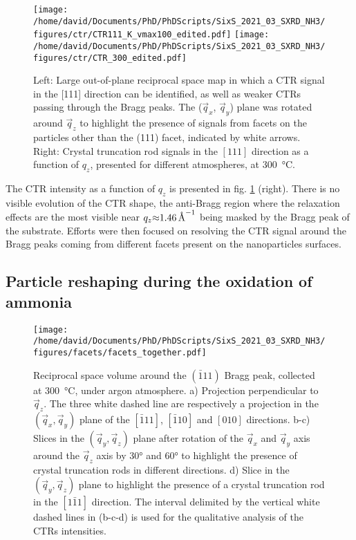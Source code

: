 \begin{figure}[!htb]
    \centering
    \texttt{[image: /home/david/Documents/PhD/PhDScripts/SixS\_2021\_03\_SXRD\_NH3/figures/ctr/CTR111\_K\_vmax100\_edited.pdf]}
    \texttt{[image: /home/david/Documents/PhD/PhDScripts/SixS\_2021\_03\_SXRD\_NH3/figures/ctr/CTR\_300\_edited.pdf]}
    \caption{
        Left: Large out-of-plane reciprocal space map in which a CTR signal in the [111] direction can be identified, as well as weaker CTRs passing through the Bragg peaks.
        The ($\vec{q}_x$, $\vec{q}_y$) plane was rotated around $\vec{q}_z$ to highlight the presence of signals from facets on the particles other than the (111) facet, indicated by white arrows.
        Right: Crystal truncation rod signals in the $[111]$ direction as a function of $q_z$, presented for different atmospheres, at \qty{300}{\degreeCelsius}.
    }
    \label{fig:2DCTR111Particles}
\end{figure}

The CTR intensity as a function of $q_z$ is presented in fig. \ref{fig:2DCTR111Particles} (right).
There is no visible evolution of the CTR shape, the anti-Bragg region where the relaxation effects are the most visible near $q_z \qty{\approx1.46}{\per\angstrom}$ being masked by the Bragg peak of the substrate.
Efforts were then focused on resolving the CTR signal around the Bragg peaks coming from different facets present on the nanoparticles surfaces.

\subsection{Particle reshaping during the oxidation of ammonia}

\begin{figure}[!htb]
    \centering
    \texttt{[image: /home/david/Documents/PhD/PhDScripts/SixS\_2021\_03\_SXRD\_NH3/figures/facets/facets\_together.pdf]}
    \caption{
        Reciprocal space volume around the $(\bar{1}11)$ Bragg peak, collected at \qty{300}{\degreeCelsius}, under argon atmosphere.
        a) Projection perpendicular to $\vec{q}_z$.
        The three white dashed line are respectively a projection in the $(\vec{q}_x, \vec{q}_y)$ plane of the $[\bar{1}11]$, $[\bar{1}10]$ and $[010]$ directions.
        b-c) Slices in the $(\vec{q}_y, \vec{q}_z)$ plane after rotation of the $\vec{q}_x$ and $\vec{q}_y$ axis around the $\vec{q}_z$ axis by \ang{30} and \ang{60} to highlight the presence of crystal truncation rods in different directions.
        d) Slice in the $(\vec{q}_y, \vec{q}_z)$ plane to highlight the presence of a crystal truncation rod in the $[1\bar{1}1]$ direction.
        The interval delimited by the vertical white dashed lines in (b-c-d) is used for the qualitative analysis of the CTRs intensities.
    }
    \label{fig:FacetMaps}
\end{figure}

